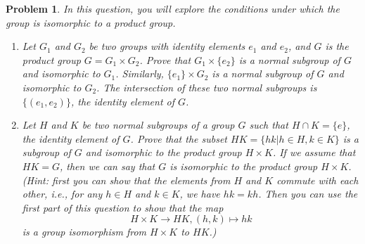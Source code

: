 \documentclass{article}
\newtheorem{ex}{Problem}
\begin{document}
\begin{ex}
In this question, you will explore the conditions under which the group is isomorphic to a product group. 
\begin{enumerate}
    \item Let $G_1$ and $G_2$ be two groups with identity elements $e_1$ and $e_2$, and $G$ is the product group $G=G_1\times G_2$. Prove that $G_1\times \{e_2\}$ is a normal subgroup of $G$ and isomorphic to $G_1$. Similarly, $\{e_1\}\times G_2$ is a normal subgroup of $G$ and isomorphic to $G_2$. The intersection of these two normal subgroups is $\{(e_1,e_2)\}$, the identity element of $G$.
    
    \item Let $H$ and $K$ be two normal subgroups of a group $G$ such that $H\cap K=\{e\}$, the identity element of $G$. Prove that the subset $HK=\{hk\vert h\in H, k\in K\}$ is a subgroup of $G$ and isomorphic to the product group $H\times K$. If we assume that $HK=G$, then we can say that $G$ is isomorphic to the product group $H\times K$. (Hint: first you can show that the elements from $H$ and $K$ commute with each other, i.e., for any $h\in H$ and $k\in K$, we have $hk=kh$. Then you can use the first part of this question to show that the map \[H\times K\to HK, (h,k)\mapsto hk\] is a group isomorphism from $H\times K$ to $HK$.)
\end{enumerate}

\end{ex}
\end{document}
